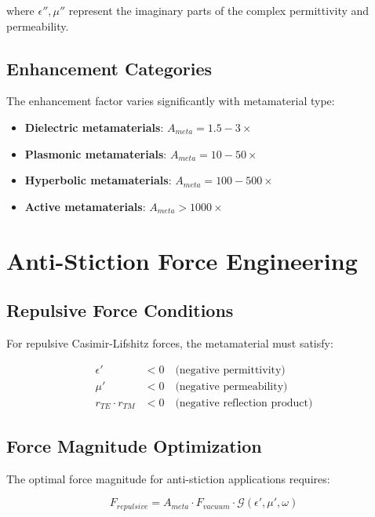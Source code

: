 \documentclass{article}
\begin{document}
where $\epsilon'', \mu''$ represent the imaginary parts of the complex permittivity and permeability.

\subsection{Enhancement Categories}

The enhancement factor varies significantly with metamaterial type:

\begin{itemize}
\item \textbf{Dielectric metamaterials}: $A_{meta} = 1.5-3\times$
\item \textbf{Plasmonic metamaterials}: $A_{meta} = 10-50\times$ 
\item \textbf{Hyperbolic metamaterials}: $A_{meta} = 100-500\times$
\item \textbf{Active metamaterials}: $A_{meta} > 1000\times$
\end{itemize}

\section{Anti-Stiction Force Engineering}

\subsection{Repulsive Force Conditions}

For repulsive Casimir-Lifshitz forces, the metamaterial must satisfy:

\begin{align}
\epsilon' &< 0 \quad \text{(negative permittivity)}\\
\mu' &< 0 \quad \text{(negative permeability)}\\
r_{TE} \cdot r_{TM} &< 0 \quad \text{(negative reflection product)}
\end{align}

\subsection{Force Magnitude Optimization}

The optimal force magnitude for anti-stiction applications requires:

\begin{equation}
F_{repulsive} = A_{meta} \cdot F_{vacuum} \cdot \mathcal{G}(\epsilon', \mu', \omega)
\end{equation}
\end{document}
